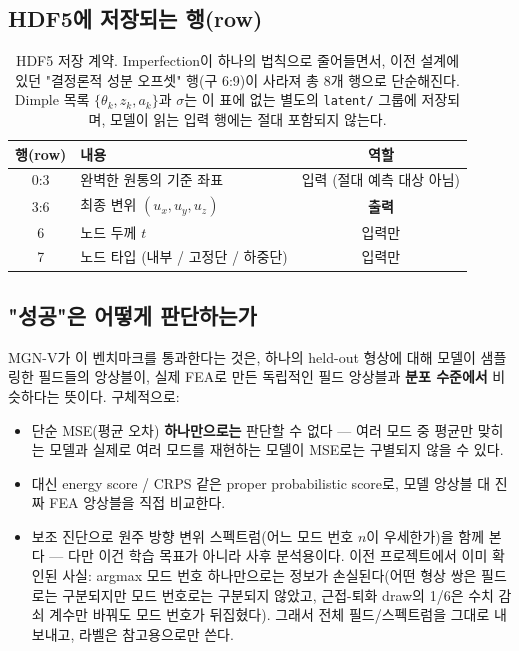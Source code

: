 \documentclass[11pt]{article}
\begin{document}
\subsection{HDF5에 저장되는 행(row)}

\begin{table}[h]
\centering
\small
\begin{tabular}{@{}clc@{}}
\toprule
행(row) & 내용 & 역할 \\
\midrule
0:3  & 완벽한 원통의 기준 좌표 & 입력 (절대 예측 대상 아님) \\
3:6  & 최종 변위 $(u_x, u_y, u_z)$ & \textbf{출력} \\
6    & 노드 두께 $t$ & 입력만 \\
7    & 노드 타입 (내부 / 고정단 / 하중단) & 입력만 \\
\bottomrule
\end{tabular}
\caption{HDF5 저장 계약. Imperfection이 하나의 법칙으로 줄어들면서, 이전 설계에
있던 "결정론적 성분 오프셋" 행(구 6:9)이 사라져 총 8개 행으로 단순해진다.
Dimple 목록 $\{\theta_k,z_k,a_k\}$과 $\sigma$는 이 표에 없는 별도의
\texttt{latent/} 그룹에 저장되며, 모델이 읽는 입력 행에는 절대 포함되지 않는다.}
\end{table}

\subsection{"성공"은 어떻게 판단하는가}

MGN-V가 이 벤치마크를 통과한다는 것은, 하나의 held-out 형상에 대해 모델이
샘플링한 필드들의 앙상블이, 실제 FEA로 만든 독립적인 필드 앙상블과
\textbf{분포 수준에서} 비슷하다는 뜻이다. 구체적으로:

\begin{itemize}
\item 단순 MSE(평균 오차) \textbf{하나만으로는} 판단할 수 없다 --- 여러 모드 중
      평균만 맞히는 모델과 실제로 여러 모드를 재현하는 모델이 MSE로는
      구별되지 않을 수 있다.
\item 대신 energy score / CRPS 같은 proper probabilistic score로, 모델
      앙상블 대 진짜 FEA 앙상블을 직접 비교한다.
\item 보조 진단으로 원주 방향 변위 스펙트럼(어느 모드 번호 $n$이 우세한가)을
      함께 본다 --- 다만 이건 학습 목표가 아니라 사후 분석용이다. 이전 프로젝트에서
      이미 확인된 사실: argmax 모드 번호 하나만으로는 정보가 손실된다(어떤
      형상 쌍은 필드로는 구분되지만 모드 번호로는 구분되지 않았고, 근접-퇴화
      draw의 1/6은 수치 감쇠 계수만 바꿔도 모드 번호가 뒤집혔다). 그래서 전체
      필드/스펙트럼을 그대로 내보내고, 라벨은 참고용으로만 쓴다.
\end{itemize}
\end{document}
